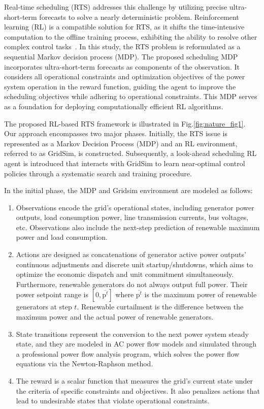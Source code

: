 Real-time scheduling (RTS) addresses this challenge by utilizing precise ultra-short-term forecasts to solve a nearly deterministic problem. 
Reinforcement learning (RL) is a compatible solution for RTS, as it shifts the time-intensive computation to the offline training process, exhibiting the ability to resolve other complex control tasks~\cite{silver2016mastering,lillicrap2015continuous,schulman2017proximal,degrave2022magnetic,fawzi2022discovering,mandhane2022muzero}.
In this study, the RTS problem is reformulated as a sequential Markov decision process (MDP). 
The proposed scheduling MDP incorporates ultra-short-term forecasts as components of the observation. It considers all operational constraints and optimization objectives of the power system operation in the reward function, guiding the agent to improve the scheduling objectives while adhering to operational constraints. 
This MDP serves as a foundation for deploying computationally efficient RL algorithms.

The proposed RL-based RTS framework is illustrated in Fig.\ref{fig:nature_fig1}. Our approach encompasses two major phases. Initially, the RTS issue is represented as a Markov Decision Process (MDP) and an RL environment, referred to as GridSim, is constructed. Subsequently, a look-ahead scheduling RL agent is introduced that interacts with GridSim to learn near-optimal control policies through a systematic search and training procedure.

In the initial phase, 
the MDP and Gridsim environment are modeled as follows:
\begin{enumerate}[label=(\arabic*)]
    \item Observations encode the grid's operational states, including generator power outputs, load consumption power, line transmission currents, bus voltages, etc. Observations also include the next-step prediction of renewable maximum power and load consumption.
    \item Actions are designed as concatenations of generator active power outputs' continuous adjustments and discrete unit startup/shutdowns, 
    which aims to optimize the economic dispatch and unit commitment simultaneously. Furthermore, renewable generators do not always output full power. Their power setpoint range is $[0, \overline{\text{p}^t}]$ where $\overline{\text{p}^t}$ is the maximum power of renewable generators at step $t$. Renewable curtailment is the difference between the maximum power and the actual power of renewable generators.
    \item State transitions represent the conversion to the next power system steady state, and they are modeled in AC power flow models and simulated through a professional power flow analysis program, which solves the power flow equations via the Newton-Raphson method. 
    \item The reward is a scalar function that measures the grid's current state under the criteria of specific constraints and objectives. It also penalizes actions that lead to undesirable states that violate operational constraints.
\end{enumerate}


